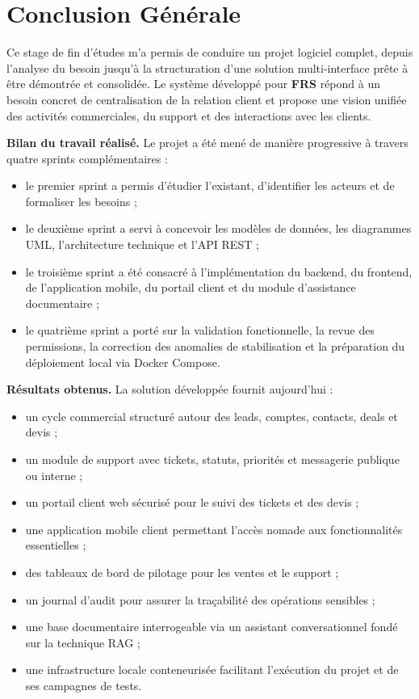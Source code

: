 \chapter*{Conclusion Générale}
\adjustmtc
\thispagestyle{MyStyle}

Ce stage de fin d'études m'a permis de conduire un projet logiciel complet, depuis l'analyse du besoin jusqu'à la structuration d'une solution multi-interface prête à être démontrée et consolidée. Le système développé pour \textbf{FRS} répond à un besoin concret de centralisation de la relation client et propose une vision unifiée des activités commerciales, du support et des interactions avec les clients.\par
\vspace{0.3cm}

\textbf{Bilan du travail réalisé.} Le projet a été mené de manière progressive à travers quatre sprints complémentaires :
\begin{itemize}
    \item le premier sprint a permis d'étudier l'existant, d'identifier les acteurs et de formaliser les besoins ;
    \item le deuxième sprint a servi à concevoir les modèles de données, les diagrammes UML, l'architecture technique et l'API REST ;
    \item le troisième sprint a été consacré à l'implémentation du backend, du frontend, de l'application mobile, du portail client et du module d'assistance documentaire ;
    \item le quatrième sprint a porté sur la validation fonctionnelle, la revue des permissions, la correction des anomalies de stabilisation et la préparation du déploiement local via Docker Compose.
\end{itemize}

\vspace{0.3cm}
\textbf{Résultats obtenus.} La solution développée fournit aujourd'hui :
\begin{itemize}
    \item un cycle commercial structuré autour des leads, comptes, contacts, deals et devis ;
    \item un module de support avec tickets, statuts, priorités et messagerie publique ou interne ;
    \item un portail client web sécurisé pour le suivi des tickets et des devis ;
    \item une application mobile client permettant l'accès nomade aux fonctionnalités essentielles ;
    \item des tableaux de bord de pilotage pour les ventes et le support ;
    \item un journal d'audit pour assurer la traçabilité des opérations sensibles ;
    \item une base documentaire interrogeable via un assistant conversationnel fondé sur la technique RAG ;
    \item une infrastructure locale conteneurisée facilitant l'exécution du projet et de ses campagnes de tests.
\end{itemize}

